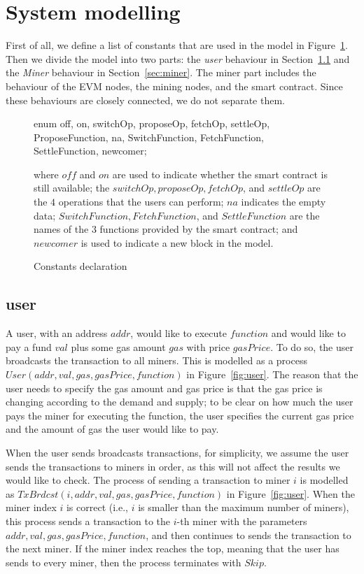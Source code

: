 \documentclass{KERauth}
\begin{document}
\section{System modelling}

First of all, we define a list of constants that are used in the model in Figure~\ref{fig:constants}. Then we divide the model into two parts: the \emph{user} behaviour in Section~\ref{sec:user} and the \emph{Miner} behaviour in Section~\ref{sec:miner}. The miner part includes the behaviour of the EVM nodes, the mining nodes, and the smart contract. Since these behaviours are closely connected, we do not separate them. 
\begin{figure}[h]
\begin{center}
\begin{boxedverbatim}
enum {off, on, switchOp, proposeOp, fetchOp, settleOp, ProposeFunction, na,   
      SwitchFunction, FetchFunction, SettleFunction, newcomer};
\end{boxedverbatim}
\end{center}
where $off$ and $on$ are used to indicate whether the smart contract is still available; the $switchOp, proposeOp, fetchOp$, and $settleOp$ are the $4$ operations that the users can perform; $na$ indicates the empty data; $SwitchFunction, FetchFunction$, and $SettleFunction$ are the names of the $3$ functions provided by the smart contract; and $newcomer$ is used to indicate a new block in the model.
\caption{Constants declaration}\label{fig:constants}
\end{figure}

\subsection{user}\label{sec:user}
A user, with an address $addr$, would like to execute $function$ and would like to pay a fund $val$ plus some gas amount $gas$ with price $gasPrice$. To do so, the user broadcasts the transaction to all miners. This is modelled as a process $User(addr, val, gas, gasPrice, function)$ in Figure~\ref{fig:user}. The reason that the user needs to specify the gas amount and gas price is that the gas price is changing according to the demand and supply; to be clear on how much the user pays the miner for executing the function, the user specifies the current gas price and the amount of gas the user would like to pay.

When the user sends broadcasts transactions, for simplicity, we assume the user sends the transactions to miners in order, as this will not affect the results we would like to check. The process of sending a transaction to miner $i$ is modelled as $TxBrdcst(i, addr, val, gas, gasPrice, function)$ in Figure~\ref{fig:user}. When the miner index $i$ is correct (i.e., $i$ is smaller than the maximum number of miners), this process sends a transaction to the $i$-th miner with the parameters $addr, val, gas, gasPrice, function$, and then continues to sends the transaction to the next miner. If the miner index reaches the top, meaning that the user has sends to every miner, then the process terminates with $Skip$.
\end{document}
